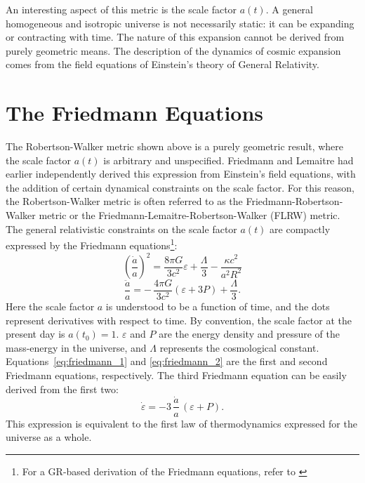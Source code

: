 An interesting aspect of this metric is the scale factor $a(t)$.  A general
homogeneous and isotropic universe is not necessarily static: it can be
expanding or contracting with time.  The nature of this expansion cannot
be derived from purely geometric means.  The description of the dynamics
of cosmic expansion comes from the field equations of Einstein's theory
of General Relativity.

\section{The Friedmann Equations}
\label{sec:friedmann}
The Robertson-Walker metric shown above is a purely geometric result,
where the scale factor $a(t)$ is arbitrary and unspecified.
Friedmann and Lemaitre had earlier independently derived this expression
from Einstein's field equations, with the addition of certain dynamical
constraints on the scale factor.  For this reason, the Robertson-Walker
metric is often referred to as the Friedmann-Robertson-Walker metric
or the Friedmann-Lemaitre-Robertson-Walker (FLRW) metric.
The general relativistic constraints on the scale factor $a(t)$
are compactly expressed by the Friedmann
equations\footnote{For a GR-based derivation of the Friedmann
  equations, refer to \citet{peebles1993principles}}:
\begin{equation}
  \label{eq:friedmann_1}
  \left(\frac{\dot{a}}{a}\right)^2
  = \frac{8\pi G}{3c^2}\varepsilon
  + \frac{\Lambda}{3} - \frac{\kappa c^2}{a^2 R^2}
\end{equation}
\begin{equation}
  \label{eq:friedmann_2}
  \frac{\ddot{a}}{a}
  = -\,\frac{4\pi G}{3c^2}(\varepsilon + 3P) + \frac{\Lambda}{3}.
\end{equation}
Here the scale factor $a$ is understood to be a function of time, and the
dots represent derivatives with respect to time.
By convention, the scale factor at the present day is $a(t_0) = 1$.
$\varepsilon$ and $P$ are
the energy density and pressure of the mass-energy in the universe, and
$\Lambda$ represents the cosmological constant.
Equations~\ref{eq:friedmann_1} and \ref{eq:friedmann_2} are the first and
second Friedmann equations, respectively.  The third Friedmann equation
can be easily derived from the first two:
\begin{equation}
  \label{eq:friedmann_3}
  \dot{\varepsilon} = -3\,\frac{\dot{a}}{a}\,(\varepsilon + P).
\end{equation}
This expression is equivalent to the first law of thermodynamics
expressed for the universe as a whole.

